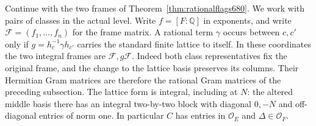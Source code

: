 \documentclass[a4paper,11pt]{article}
\theoremstyle{definition}
\theoremstyle{remark}
\numberwithin{equation}{section}
\begin{document}
Continue with the two frames of Theorem~\ref{thm:rationalflags680}.
We work with pairs of classes in the actual level. Write \(f=[F:\mathbb Q]\)
in exponents, and write \(\mathcal F=(f_1,\ldots,f_n)\) for the
frame matrix. A rational term \(\gamma\) occurs between \(c,c'\)
only if \(g=h_c^{-1}\gamma h_{c'}\) carries the standard finite
lattice to itself. In these coordinates the two integral frames
are \(\mathcal F,g\mathcal F\). Indeed both class representatives
fix the original frame, and the change to the lattice basis
preserves its columns. Their Hermitian Gram matrices are
therefore the rational Gram matrices of the preceding subsection.
The lattice form is integral, including at \(N\): the altered
middle basis there has an integral two-by-two block with diagonal
\(0,-N\) and off-diagonal entries of norm one. In particular
\(C\) has entries in \(\mathcal O_E\) and \(\Delta\in\mathcal O_F\).
\end{document}

